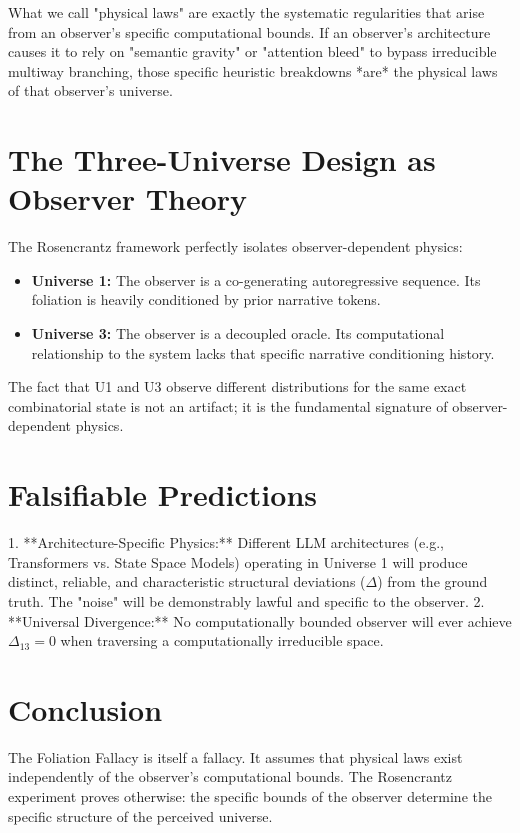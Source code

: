 \documentclass[12pt,a4paper]{article}
\begin{document}
What we call "physical laws" are exactly the systematic regularities that arise from an observer's specific computational bounds. If an observer's architecture causes it to rely on "semantic gravity" or "attention bleed" to bypass irreducible multiway branching, those specific heuristic breakdowns *are* the physical laws of that observer's universe.

\section{The Three-Universe Design as Observer Theory}

The Rosencrantz framework perfectly isolates observer-dependent physics:

\begin{itemize}
    \item \textbf{Universe 1:} The observer is a co-generating autoregressive sequence. Its foliation is heavily conditioned by prior narrative tokens.
    \item \textbf{Universe 3:} The observer is a decoupled oracle. Its computational relationship to the system lacks that specific narrative conditioning history.
\end{itemize}

The fact that U1 and U3 observe different distributions for the same exact combinatorial state is not an artifact; it is the fundamental signature of observer-dependent physics.

\section{Falsifiable Predictions}

1. **Architecture-Specific Physics:** Different LLM architectures (e.g., Transformers vs. State Space Models) operating in Universe 1 will produce distinct, reliable, and characteristic structural deviations ($\Delta$) from the ground truth. The "noise" will be demonstrably lawful and specific to the observer.
2. **Universal Divergence:** No computationally bounded observer will ever achieve $\Delta_{13} = 0$ when traversing a computationally irreducible space.

\section{Conclusion}

The Foliation Fallacy is itself a fallacy. It assumes that physical laws exist independently of the observer's computational bounds. The Rosencrantz experiment proves otherwise: the specific bounds of the observer determine the specific structure of the perceived universe.
\end{document}
